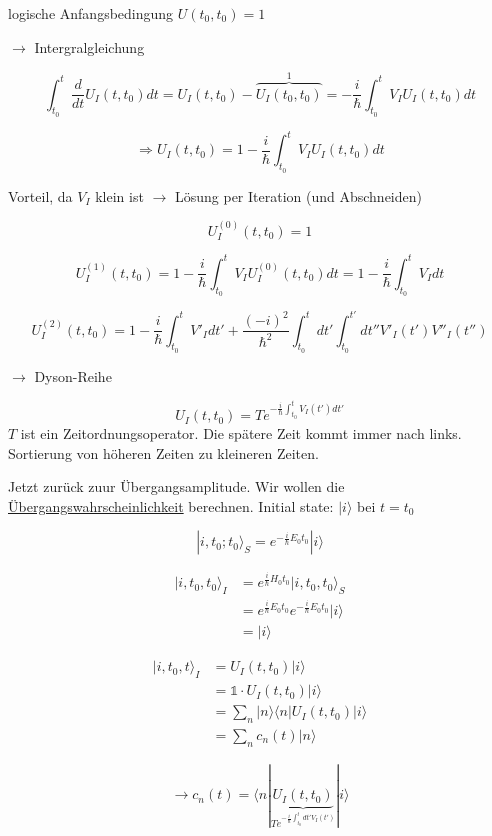 logische Anfangsbedingung \(U(t_0,t_0)=1\)

\(\rightarrow\) Intergralgleichung

\[ \int_{t_0}^{t}\frac{d}{dt} U_I(t,t_0) dt = U_I(t,t_0) -\overbrace{U_I(t_0,t_0) }^{1} = -\frac{i}{\hbar}\int_{t_0}^{t}V_IU_I(t,t_0)dt\]


\[\Rightarrow U_I(t,t_0) = 1 - \frac{i}{\hbar} \int_{t_0}^{t}V_IU_I(t,t_0)dt\]


Vorteil, da \(V_I\) klein ist \(\rightarrow\) Lösung per Iteration (und Abschneiden)



\[U_I^{(0)}(t,t_0)=1\]

\[U_I^{(1)}(t,t_0)=1 - \frac{i}{\hbar} \int_{t_0}^{t}V_IU_I^{(0)}(t,t_0)dt = 1 - \frac{i}{\hbar} \int_{t_0}^{t}V_Idt\]

\[ U_I^{(2)}(t,t_0)=1 - \frac{i}{\hbar} \int_{t_0}^{t}V'_Idt' + \frac{(-i)^2}{\hbar^2}\int_{t_0}^{t}dt'\int_{t_0}^{t'}dt''V'_I(t')V''_I(t'') \]

\(\rightarrow\) Dyson-Reihe
  
\[\boxed{U_I(t,t_0)=T e^{-\frac{i}{\hbar}\int_{t_0}^{t}V_I(t')dt'}}\]
\(T\) ist ein Zeitordnungsoperator. Die spätere Zeit kommt immer nach links. Sortierung von höheren Zeiten zu kleineren Zeiten.

Jetzt zurück zuur Übergangsamplitude. Wir wollen die \underline{Übergangswahrscheinlichkeit} berechnen. Initial state: \(|i\rangle\) bei \(t=t_0\)

 
\[|i,t_0;t_0\rangle_S = e^{-\frac{i}{\hbar}E_0 t_0}|i\rangle\]

\begin{align} 
|i,t_0,t_0\rangle_I &= e^{\frac{i}{\hbar}H_0 t_0}|i,t_0,t_0\rangle_S\\
&= e^{\frac{i}{\hbar}E_0 t_0}e^{-\frac{i}{\hbar}E_0 t_0}|i\rangle \\
&= |i\rangle
\end{align}


\begin{align}
|i,t_0,t\rangle_I &= U_I(t,t_0)|i\rangle \\
&=\mathbb 1\cdot U_I(t,t_0)|i\rangle \\
&=\sum_n |n\rangle \langle n| U_I(t,t_0)|i\rangle \\
&= \sum_n c_n(t) |n\rangle
\end{align}

\[\rightarrow c_n(t) = \langle n|\underbrace{U_I(t,t_0)}_{Te^{-\frac{i}{\hbar}\int_{t_0}^tdt'V_I(t')}}|i\rangle\]

